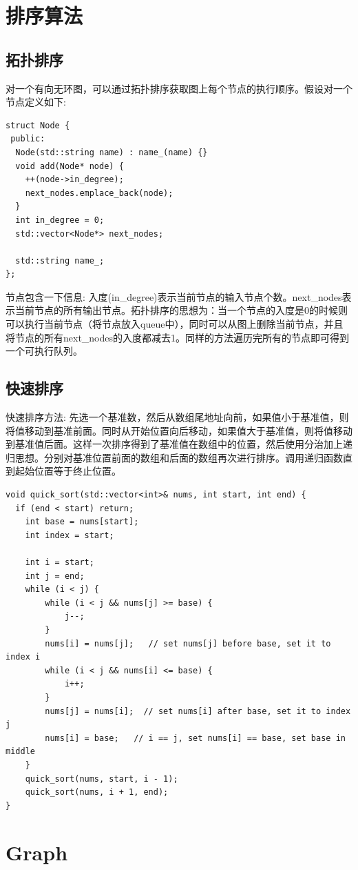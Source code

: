 \documentclass[12pt]{book}
\begin{document}
\section{排序算法}
\subsection{拓扑排序}
对一个有向无环图，可以通过拓扑排序获取图上每个节点的执行顺序。假设对一个节点定义如下:
\begin{lstlisting}
struct Node {
 public:
  Node(std::string name) : name_(name) {}
  void add(Node* node) {
	++(node->in_degree);
	next_nodes.emplace_back(node);
  }
  int in_degree = 0;
  std::vector<Node*> next_nodes;
	
  std::string name_;
};
\end{lstlisting}
节点包含一下信息: 入度(in\_degree)表示当前节点的输入节点个数。next\_nodes表示当前节点的所有输出节点。拓扑排序的思想为：当一个节点的入度是0的时候则可以执行当前节点（将节点放入queue中），同时可以从图上删除当前节点，并且将节点的所有next\_nodes的入度都减去1。同样的方法遍历完所有的节点即可得到一个可执行队列。

\subsection{快速排序}
快速排序方法:
先选一个基准数，然后从数组尾地址向前，如果值小于基准值，则将值移动到基准前面。同时从开始位置向后移动，如果值大于基准值，则将值移动到基准值后面。这样一次排序得到了基准值在数组中的位置，然后使用分治加上递归思想。分别对基准位置前面的数组和后面的数组再次进行排序。调用递归函数直到起始位置等于终止位置。
\begin{lstlisting}
void quick_sort(std::vector<int>& nums, int start, int end) {
  if (end < start) return;
	int base = nums[start];
	int index = start;
		
	int i = start;
	int j = end;
	while (i < j) {
		while (i < j && nums[j] >= base) {
			j--;
		}
		nums[i] = nums[j];   // set nums[j] before base, set it to index i
		while (i < j && nums[i] <= base) {
			i++;
		}
		nums[j] = nums[i];  // set nums[i] after base, set it to index j
		nums[i] = base;   // i == j, set nums[i] == base, set base in middle
	}
	quick_sort(nums, start, i - 1);
	quick_sort(nums, i + 1, end);
}
\end{lstlisting}

\section{Graph}
\end{document}
